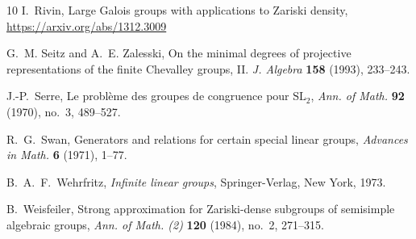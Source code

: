 \documentclass[11pt]{amsart}
\theoremstyle{definition}
\theoremstyle{remark}
\begin{document}
\begin{thebibliography}{10}
I.~Rivin, Large Galois groups with applications to Zariski density,
\url{https://arxiv.org/abs/1312.3009}

G.~M. Seitz and A.~E. Zalesski,  On the minimal degrees of 
projective representations of the finite
  Chevalley groups, II.
 {\em J. Algebra} \textbf{158} (1993), 233--243.

J.-P.~Serre,
Le probl\`{e}me des groupes de congruence pour $\mathrm{SL}_2$,
{\em Ann. of Math.} \textbf{92} (1970), no.~3, 489--527.

R.~G.~Swan,  Generators and relations for certain special linear groups,
\emph{Advances in Math.} 
\textbf{6} (1971), 1--77.

B.~A.~F.~Wehrfritz, \emph{Infinite linear groups}, 
Springer-Verlag, New York, 1973.

B.~Weisfeiler,
Strong approximation for Zariski-dense subgroups of semisimple 
algebraic groups, \emph{Ann. of Math. (2)} \textbf{120} (1984), 
no.~2, 271--315.


\end{thebibliography}
\end{document}
